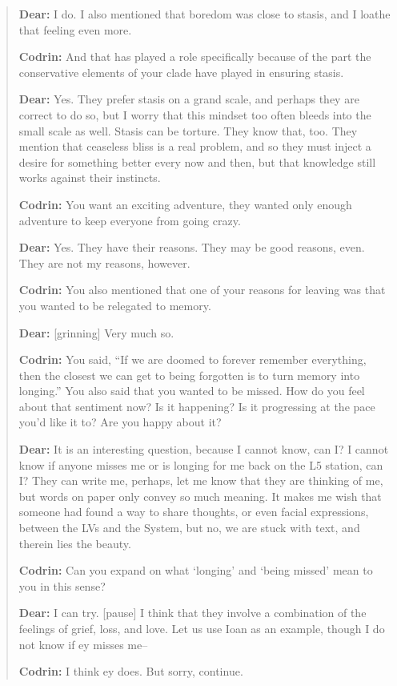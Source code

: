\begin{quote}
\textbf{Dear:} I do. I also mentioned that boredom was close to stasis, and I loathe that feeling even more.

\textbf{Codrin:} And that has played a role specifically because of the part the conservative elements of your clade have played in ensuring stasis.

\textbf{Dear:} Yes. They prefer stasis on a grand scale, and perhaps they are correct to do so, but I worry that this mindset too often bleeds into the small scale as well. Stasis can be torture. They know that, too. They mention that ceaseless bliss is a real problem, and so they must inject a desire for something better every now and then, but that knowledge still works against their instincts.

\textbf{Codrin:} You want an exciting adventure, they wanted only enough adventure to keep everyone from going crazy.

\textbf{Dear:} Yes. They have their reasons. They may be good reasons, even. They are not my reasons, however.

\textbf{Codrin:} You also mentioned that one of your reasons for leaving was that you wanted to be relegated to memory.

\textbf{Dear:} {[}grinning{]} Very much so.

\textbf{Codrin:} You said, ``If we are doomed to forever remember everything, then the closest we can get to being forgotten is to turn memory into longing.'' You also said that you wanted to be missed. How do you feel about that sentiment now? Is it happening? Is it progressing at the pace you'd like it to? Are you happy about it?

\textbf{Dear:} It is an interesting question, because I cannot know, can I? I cannot know if anyone misses me or is longing for me back on the L5 station, can I? They can write me, perhaps, let me know that they are thinking of me, but words on paper only convey so much meaning. It makes me wish that someone had found a way to share thoughts, or even facial expressions, between the LVs and the System, but no, we are stuck with text, and therein lies the beauty.

\textbf{Codrin:} Can you expand on what `longing' and `being missed' mean to you in this sense?

\textbf{Dear:} I can try. {[}pause{]} I think that they involve a combination of the feelings of grief, loss, and love. Let us use Ioan as an example, though I do not know if ey misses me--

\textbf{Codrin:} I think ey does. But sorry, continue.


\end{quote}

